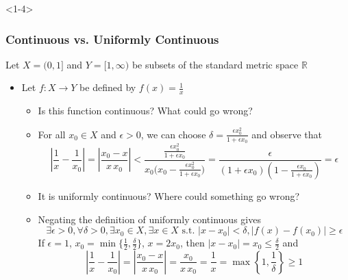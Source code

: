 \documentclass[10pt,english,aspectratio=169]{beamer}
\begin{document}
\begin{frame}<1-4>
\frametitle{Continuous vs. Uniformly Continuous}

\vspace{1mm}
Let $X = (0,1]$ and $Y=[1,\infty)$ be subsets of the standard metric space $\mathbb{R}$
\vspace{1mm}

\begin{itemize}
\setlength\itemsep{3mm}
\item<1-> Let $f:X \to Y$ be defined by $f(x) = \frac{1}{x}$ \vspace{1mm}

\begin{itemize} 
  \setlength\itemsep{1.5mm}
  \item<1-> Is this function continuous?  What could go wrong?
  \item<2-> For all $x_0 \in X$ and $\epsilon>0$, we can choose $\delta = \frac{\epsilon x_0^2}{1+\epsilon x_0}$ and observe that \vspace{-2mm}
  \[ \left| \frac{1}{x}-\frac{1}{x_0} \right| = \left| \frac{x_0 - x}{x \, x_0} \right| < \frac{\frac{\epsilon x_0^2}{1+\epsilon x_0}}{x_0 \big( x_0 - \frac{\epsilon x_0^2}{1+\epsilon x_0} \big)} = \frac{\epsilon}{(1+\epsilon x_0)( 1 - \frac{\epsilon x_0}{1+\epsilon x_0})} = \epsilon\] \vspace{-0.5mm}
  
  \item<3-> It is uniformly continuous? Where could something go wrong?
  
  \item<4-> Negating the definition of uniformly continuous gives \vspace{-2mm} \[\!\!\!\!\!\!\!\exists \epsilon >0, \forall \delta >0, \exists x_0 \in X, \exists x\in X \text{ s.t. } |x-x_0|<\delta, |f(x)-f(x_0)|\geq \epsilon \]
  If $\epsilon = 1$, $x_0 = \min\big\{ \frac{1}{2},\frac{\delta}{2} \big\}$, $x=2 x_0$, then $| x - x_0 | = x_0 \leq \frac{\delta}{2}$ and \vspace{-1mm}
    \[ \left| \frac{1}{x}-\frac{1}{x_0} \right| = \left| \frac{x_0 - x}{x \, x_0} \right| = \frac{x_0}{x \, x_0} = \frac{1}{x} = \max\left\{1,\frac{1}{\delta}\right\} \geq 1 \]

\end{itemize}

\end{itemize}



\end{frame}
\end{document}
